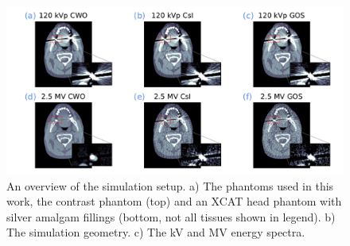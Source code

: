 \begin{figure}[ht!]
  \begin{center}
   \includegraphics[width=\linewidth,trim={3cm 4cm 2.8cm 4cm}, clip]{figures/Figure_5.pdf}
   \caption{An overview of the simulation setup. a) The phantoms used in this work, the contrast phantom (top) and an XCAT head phantom with silver amalgam fillings (bottom, not all tissues shown in legend). b) The simulation geometry. c) The kV and MV energy spectra.\label{fig_setup_cwo}}
    \end{center}
\end{figure}



